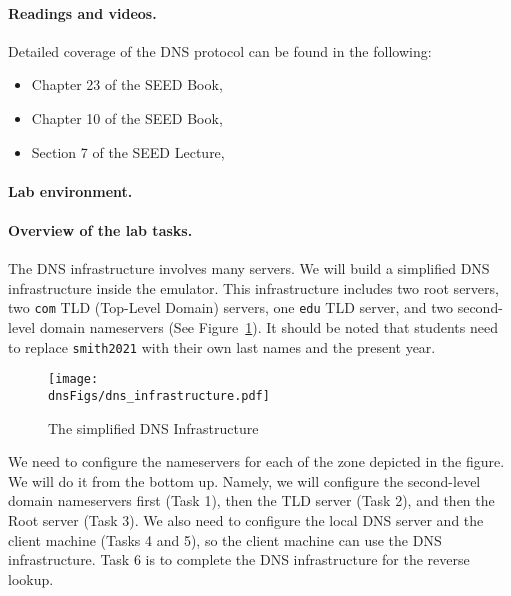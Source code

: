 \paragraph{Readings and videos.}
Detailed coverage of the DNS protocol can be found in the following:

\begin{itemize}
\item Chapter 23 of the SEED Book, \seedcibook
\item Chapter 10 of the SEED Book, \seedisbook
\item Section 7 of the SEED Lecture, \seedisvideo
\end{itemize}


\paragraph{Lab environment.} 
\seedenvironmentB
\nodependency

\paragraph{Overview of the lab tasks.}
The DNS infrastructure involves many servers. We will
build a simplified DNS infrastructure inside the emulator. 
This infrastructure includes two root servers, two \texttt{com}
TLD (Top-Level Domain) servers, one \texttt{edu} TLD server,
and two second-level domain nameservers (See 
Figure~\ref{dns:fig:dns-infrastructure}). It should be noted 
that students need to replace \texttt{smith2021} with their 
own last names and the present year. 


\begin{figure}[htb]
  \begin{center}
    \texttt{[image: \\dnsFigs/dns\_infrastructure.pdf]}
  \end{center}
  \caption{The simplified DNS Infrastructure}
  \label{dns:fig:dns-infrastructure}
\end{figure}

We need to configure the nameservers for each of the zone
depicted in the figure. We will do it from the bottom up.
Namely, we will configure the second-level domain nameservers
first (Task 1), then the TLD server (Task 2), and 
then the Root server (Task 3). We also need to configure
the local DNS server and the client machine (Tasks 4 and 5), 
so the client machine can use the DNS infrastructure. 
Task 6 is to complete the DNS infrastructure for the reverse 
lookup.


